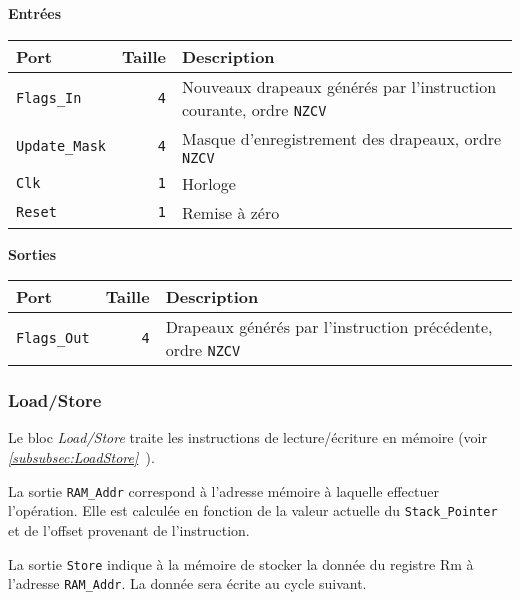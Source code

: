 
\textbf{Entrées}\\

\begin{tabular}{|l|r|l|}
\hline
\textbf{Port}		& \textbf{Taille} & \textbf{Description}\\
\hline

\texttt{Flags\_In}	&  \texttt{4} & Nouveaux drapeaux générés par l'instruction courante, ordre \texttt{NZCV}\\
\hline
\texttt{Update\_Mask}	&  \texttt{4} & Masque d'enregistrement des drapeaux, ordre \texttt{NZCV}\\
\hline
\texttt{Clk}		&  \texttt{1} & Horloge\\
\hline
\texttt{Reset}		&  \texttt{1} & Remise à zéro\\


\hline
\end{tabular}

\vspace{1em}
\textbf{Sorties}\\

\begin{tabular}{|l|r|l|}
\hline 
\textbf{Port} & \textbf{Taille} & \textbf{Description}\\
\hline

\texttt{Flags\_Out}	&  \texttt{4} & Drapeaux générés par l'instruction précédente, ordre \texttt{NZCV}\\

\hline
\end{tabular}



\subsubsection{Load/Store}


Le bloc \textit{Load/Store} traite les instructions de lecture/écriture en mémoire (voir \textit{\ref{subsubsec:LoadStore}~}).

La sortie \texttt{RAM\_Addr} correspond à l'adresse mémoire à laquelle effectuer l'opération.
Elle est calculée en fonction de la valeur actuelle du \texttt{Stack\_Pointer} et de l'offset provenant de l'instruction.

La sortie \texttt{Store} indique à la mémoire de stocker la donnée du registre Rm à l'adresse \texttt{RAM\_Addr}. La donnée sera écrite au cycle suivant.

